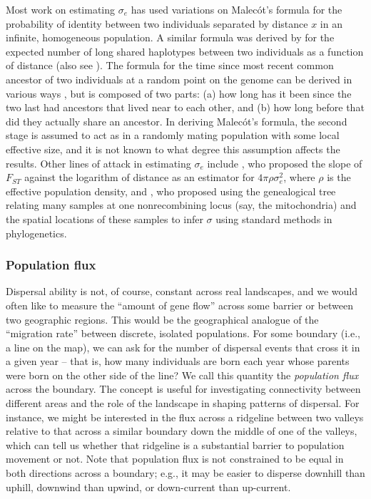 \documentclass{ar-1col}
\begin{document}
Most work on estimating $\sigma_e$ has used variations on Malec\'ot's formula \citep{malecot}
for the probability of identity between two individuals separated by distance $x$
in an infinite, homogeneous population.
A similar formula was derived by \citet{ringbauer2017inferring}
for the expected number of long shared haplotypes between two individuals as a function of distance
(also see \citet{alasadi2018estimating}).
The formula for
the time since most recent common ancestor of two individuals at a random point on the genome
can be derived in various ways 
\citep{sawyer1976branching, barton-depaulis-etheridge, rousset_1997},
but is composed of two parts: 
(a) how long has it been since the two last had ancestors that lived near to each other,
and (b) how long before that did they actually share an ancestor.
In deriving Malec\'ot's formula, the second stage is assumed to act as in a randomly mating population
with some local effective size,
and it is not known to what degree this assumption affects the results.
Other lines of attack in estimating $\sigma_e$ include 
\citet{rousset_1997}, 
who proposed the slope of $F_{ST}$ against the logarithm of distance
as an estimator for $4 \pi \rho \sigma_e^2$,
where $\rho$ is the effective population density,
and 
\citet{neigel1991estimation,neigel1993application}, 
who proposed using the genealogical tree relating many samples at one nonrecombining locus
(say, the mitochondria) and the spatial locations of these samples
to infer $\sigma$ using standard methods in phylogenetics.

\subsubsection{Population flux}

Dispersal ability is not, of course, constant across real landscapes, and
we would often like to measure the ``amount of gene flow'' across some barrier
or between two geographic regions.
This would be the geographical analogue of
the ``migration rate'' between discrete, isolated populations.
For some boundary (i.e., a line on the map),
we can ask for the number of dispersal events that cross it in a given year -- 
that is, 
how many individuals are born each year whose parents
were born on the other side of the line?
We call this quantity the \textit{population flux} across the boundary.
The concept is useful for investigating connectivity between different areas
and the role of the landscape in shaping patterns of dispersal.
For instance,
we might be interested in the flux across a ridgeline between two valleys
relative to that across a similar boundary down the middle of one of the valleys,
which can tell us whether that ridgeline is a substantial barrier to population movement or not.
Note that population flux is not constrained to be equal in both directions across a boundary;
e.g., it may be easier to disperse downhill than uphill,
downwind than upwind,
or down-current than up-current.
\end{document}
